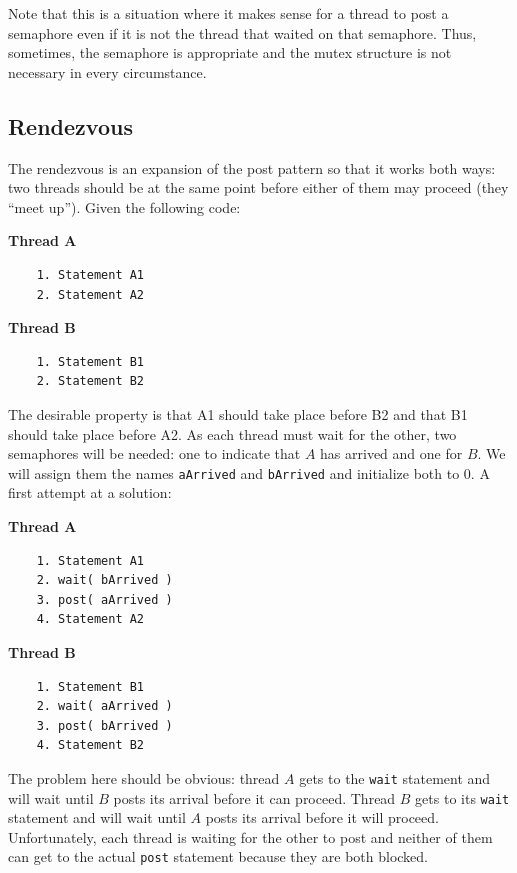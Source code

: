 Note that this is a situation where it makes sense for a thread to post a semaphore even if it is not the thread that waited on that semaphore. Thus, sometimes, the semaphore is appropriate and the mutex structure is not necessary in every circumstance.

\subsection*{Rendezvous}
The rendezvous is an expansion of the post pattern so that it works both ways: two threads should be at the same point before either of them may proceed (they ``meet up''). Given the following code:

\begin{multicols}{2}
	\textbf{Thread A}\vspace{-2em}
	\begin{verbatim}
	1. Statement A1
	2. Statement A2
  \end{verbatim}
	\columnbreak
	\textbf{Thread B}\vspace{-2em}
	\begin{verbatim}
	1. Statement B1
	2. Statement B2
  \end{verbatim}
\end{multicols}
\vspace{-2em}

The desirable property is that A1 should take place before B2 and that B1 should take place before A2. As each thread must wait for the other, two semaphores will be needed: one to indicate that $A$ has arrived and one for $B$. We will assign them the names \texttt{aArrived} and \texttt{bArrived} and initialize both to 0. A first attempt at a solution:

\begin{multicols}{2}
	\textbf{Thread A}\vspace{-2em}
	\begin{verbatim}
	1. Statement A1
	2. wait( bArrived )
	3. post( aArrived )
	4. Statement A2
  \end{verbatim}
	\columnbreak
	\textbf{Thread B}\vspace{-2em}
	\begin{verbatim}
	1. Statement B1
	2. wait( aArrived )
	3. post( bArrived )
	4. Statement B2
  \end{verbatim}
\end{multicols}
\vspace{-2em}


The problem here should be obvious: thread $A$ gets to the \texttt{wait} statement and will wait until $B$ posts its arrival before it can proceed. Thread $B$ gets to its \texttt{wait} statement and will wait until $A$ posts its arrival before it will proceed. Unfortunately, each thread is waiting for the other to post and neither of them can get to the actual \texttt{post} statement because they are both blocked.

